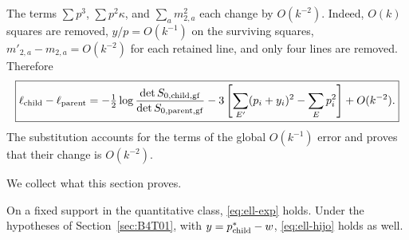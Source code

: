 The terms $\sum p^3$, $\sum p^2\kappa$, and $\sum_a m_{2,a}^2$ each change by $O(k^{-2})$. Indeed, $O(k)$
squares are removed, $y/p=O(k^{-1})$ on the surviving squares, $m'_{2,a}-m_{2,a}=O(k^{-2})$ for each
retained line, and only four lines are removed.
Therefore
\begin{equation}\label{eq:ell-hijo}
 \boxed{\ell_{\rm child}-\ell_{\rm parent}
 =-\tfrac12\log\frac{\det S_{0,\rm child,gf}}{\det S_{0,\rm parent,gf}}
 -3\left[\sum_{E'}(p_i+y_i)^2-\sum_Ep_i^2\right]+O(k^{-2}).}
\end{equation}
The substitution accounts for the terms of the global $O(k^{-1})$ error and proves that their change is
$O(k^{-2})$.

We collect what this section proves.
\begin{lemasub}\label{lem:prefactor}
On a fixed support in the quantitative class, \eqref{eq:ell-exp} holds. Under the hypotheses of
Section~\ref{sec:B4T01}, with $y=p^*_{\rm child}-w$, \eqref{eq:ell-hijo} holds as well.
\end{lemasub}
